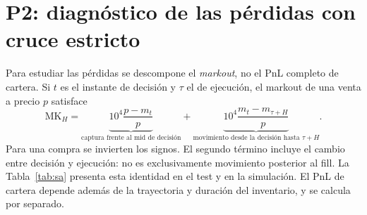 \begin{table}[htbp]
\centering\footnotesize
\caption[PnL en el periodo posterior con cruce estricto.]{PnL con cruce estricto en la simulación (36 días), bruto de comisiones; modelos congelados, HJB con curva interpolada. PnL por ejecución con IC95 por días.}
\label{tab:sim-pnl}
\end{table}

\section{P2: diagnóstico de las pérdidas con cruce estricto}
\label{sec:p2-origen}

Para estudiar las pérdidas se descompone el \textit{markout}, no el PnL completo de cartera. Si $t$ es el instante de decisión y $\tau$ el de ejecución, el markout de una venta a precio $p$ satisface
\begin{equation}
 \mathrm{MK}_H=\underbrace{10^4\frac{p-m_t}{p}}_{\text{captura frente al mid de decisión}}
 +\underbrace{10^4\frac{m_t-m_{\tau+H}}{p}}_{\text{movimiento desde la decisión hasta }\tau+H}.
 \label{eq:descomposicion-markout}
\end{equation}
Para una compra se invierten los signos. El segundo término incluye el cambio entre decisión y ejecución: no es exclusivamente movimiento posterior al fill. La Tabla~\ref{tab:sa} presenta esta identidad en el test y en la simulación. El PnL de cartera depende además de la trayectoria y duración del inventario, y se calcula por separado.

